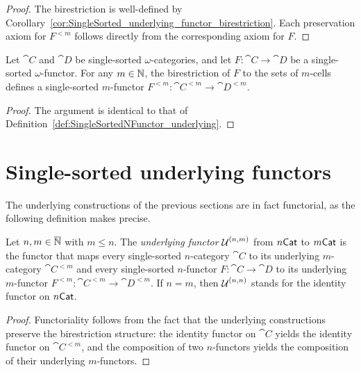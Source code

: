 \begin{proof}
  \leanok
  The birestriction is well-defined by
  Corollary~\ref{cor:SingleSorted_underlying_functor_birestriction}. Each preservation axiom for
  $F^{<m}$ follows directly from the corresponding axiom for $F$.
\end{proof}

\begin{construction}
  \label{def:SingleSortedOmegaFunctor_underlying}
  \leanok
  Let $\cat{C}$ and $\cat{D}$ be single-sorted $\omega$-categories, and let $F \colon \cat{C} \to
  \cat{D}$ be a single-sorted $\omega$-functor. For any $m \in \mathbb{N}$, the birestriction of $F$ to the
  sets of $m$-cells defines a single-sorted $m$-functor $F^{<m} \colon \cat{C}^{<m} \to
  \cat{D}^{<m}$.
\end{construction}

\begin{proof}
  \leanok
  The argument is identical to that of Definition~\ref{def:SingleSortedNFunctor_underlying}.
\end{proof}

\section{Single-sorted underlying functors}

The underlying constructions of the previous sections are in fact functorial, as the following
definition makes precise.

\begin{construction}
  \label{def:SingleSortedUnderlyingFunctor}
  \leanok
  Let $n, m \in \overline{\mathbb{N}}$ with $m \leq n$. The \emph{underlying functor} $\operatorname{\mathcal{U}}^{(n, m)}$ from
  $n\mathsf{Cat}$ to $m\mathsf{Cat}$ is the functor that maps every single-sorted $n$-category $\cat{C}$ to its
  underlying $m$-category $\cat{C}^{<m}$ and every single-sorted $n$-functor $F \colon \cat{C} \to
  \cat{D}$ to its underlying $m$-functor $F^{<m} \colon \cat{C}^{<m} \to \cat{D}^{<m}$. If $n = m$,
  then $\operatorname{\mathcal{U}}^{(n, n)}$ stands for the identity functor on $n\mathsf{Cat}$.
\end{construction}

\begin{proof}
  \leanok
  Functoriality follows from the fact that the underlying constructions preserve the birestriction
  structure: the identity functor on $\cat{C}$ yields the identity functor on $\cat{C}^{<m}$, and
  the composition of two $n$-functors yields the composition of their underlying $m$-functors.
\end{proof}
